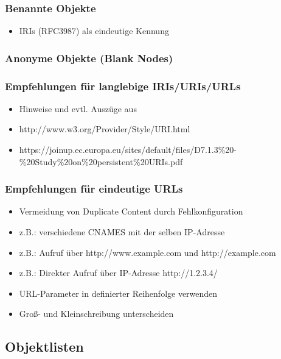 \documentclass[,a4paper]{article}
\begin{document}
\subsubsection{Benannte Objekte}

\begin{itemize}
\item
  IRIs (RFC3987) als eindeutige Kennung
\end{itemize}

\subsubsection{Anonyme Objekte (Blank Nodes)}

\subsubsection{Empfehlungen für langlebige IRIs/URIs/URLs}

\begin{itemize}
\item
  Hinweise und evtl. Auszüge aus
\item
  http://www.w3.org/Provider/Style/URI.html
\item
  https://joinup.ec.europa.eu/sites/default/files/D7.1.3\%20-\%20Study\%20on\%20persistent\%20URIs.pdf
\end{itemize}

\subsubsection{Empfehlungen für eindeutige URLs}

\begin{itemize}
\item
  Vermeidung von Duplicate Content durch Fehlkonfiguration
\item
  z.B.: verschiedene CNAMES mit der selben IP-Adresse
\item
  z.B.: Aufruf über http://www.example.com und http://example.com
\item
  z.B.: Direkter Aufruf über IP-Adresse http://1.2.3.4/
\item
  URL-Parameter in definierter Reihenfolge verwenden
\item
  Groß- und Kleinschreibung unterscheiden
\end{itemize}

\subsection{Objektlisten}
\end{document}
